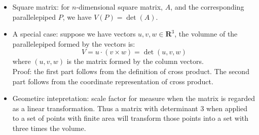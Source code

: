 \documentclass{report}
\begin{document}
\begin{itemize}
\item Square matrix: for $n$-dimensional square matrix, $A$, and the corresponding parallelepiped $P$, we have $V(P) = \det(A)$. 

\item A special case: suppose we have vectors $u, v, w \in \mathbf{R}^3$, the volumne of the parallelepiped formed by the vectors is: 
\begin{equation}
V = u \cdot (v \times w) = \det (u, v, w)
\end{equation}
where $(u, v, w)$ is the matrix formed by the column vectors. \\
Proof: the first part follows from the definition of cross product. The second part follows from the coordinate representation of cross product. 

\item Geometirc intepretation: scale factor for measure when the matrix is regarded as a linear transformation. Thus a matrix with determinant 3 when applied to a set of points with finite area will transform those points into a set with three times the volume. 
\end{itemize}
\end{document}

